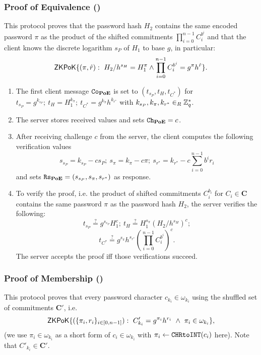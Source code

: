 \subsubsection{Proof of Equivalence (\PoE)}
This protocol proves that the password hash $H_2$ contains the same encoded password $\pi$ as the product of the shifted commitments $\prod_{i=0}^{n-1} C^{b^i}_i$ and that the client knows the discrete logarithm $s_P$ of $H_1$ to base $g$, in particular:
\[
  \mathsf{ZKPoK}\{(\pi,\hat{r}) : ~ H_2/h^{s_H}=H_1^{\pi} \wedge \prod_{i=0}^{n-1} C_i^{b^i} = g^{\pi}h^{\hat{r}}\}.
\]
\begin{enumerate}
  \item The first client message $\mathtt{Co}_\mathsf{\bf PoE}$ is set to $(t_{s_P}, t_H, t_{C^\ast})$ for
    $t_{s_P}=g^{k_{s_P}};~ t_H=H_1^{k_{\pi}};~ t_{C^\ast}=g^{k_{\pi}}h^{k_{r^{\ast}}}$
    with 
    $k_{s_P},k_{\pi},k_{r^\ast}\in_R\mathbb{Z}^\ast_q$.
    
  \item The server stores received values and sets $\mathtt{Ch}_\mathsf{\bf PoE}=c$. 
  
  \item After receiving challenge $c$ from the server, the client computes the following verification values
    \[
      s_{s_P}=k_{s_P}-c s_P;~ s_{\pi}=k_\pi - c \pi;~ s_{r^\ast}=k_{r^\ast} - c \sum_{i=0}^{n-1} b^i r_i
    \]
    and sets $\mathtt{Rs}_\mathsf{\bf PoE}=(s_{s_P}, s_\pi, s_{r^\ast})$ as response.
  
  \item To verify the proof, i.e. the product of shifted commitments $C_i^{b_i}$ for $C_i\in\bm C$ contains the same password $\pi$ as the password hash $H_2$, the server verifies the following:
    \[
      t_{s_P}\stackrel{?}{=}g^{s_{s_P}}H_1^{c};~ t_H\stackrel{?}{=}H_1^{s_\pi}(H_2/h^{s_H})^c;
    \]
    \[
      t_{C^\ast}\stackrel{?}{=}g^{s_\pi}h^{s_{r^\ast}} \left(\prod_{i=0}^{n-1} C^{b^i}_i \right)^c.
    \]
    The server accepts the proof iff those verifications succeed.
\end{enumerate}


\subsubsection{Proof of Membership (\PoM)}
This protocol proves that every password character $c_{k_i}\in\omega_{k_i}$ using the shuffled set of commitments $\bm C'$, i.e.
\[\mathsf{ZKPoK}\{(\{\pi_i,r_i\}_{i\in[0,n-1]}) : ~ C'_{{k_i}}=g^{\pi_{i}}h^{r_{i}} ~ \wedge ~ \pi_{i}\in \omega_{{k_i}}\},\]
(we use $\pi_{i}\in \omega_{{k_i}}$ as a short form of $c_i\in\omega_{{k_i}}$ with $\pi_i\gets \texttt{CHRtoINT}(c_i)$ here).
Note that $C'_{k_i}\in \bm C'$.


